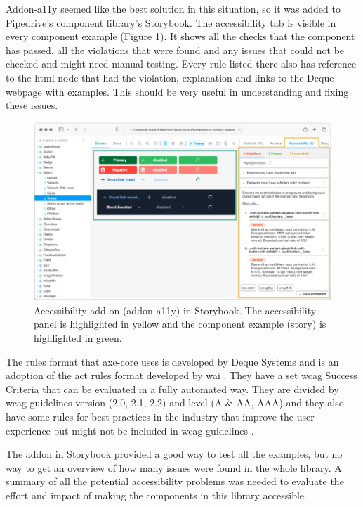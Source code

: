 \documentclass{master_thesis}
\begin{document}
Addon-a11y seemed like the best solution in this situation, so it was added to Pipedrive's component library’s Storybook. The accessibility tab is visible in every component example (Figure \ref{fig:addon-a11y}). It shows all the checks that the component has passed, all the violations that were found and any issues that could not be checked and might need manual testing. Every rule listed there also has reference to the \ac{html} node that had the violation, explanation and links to the Deque webpage with examples. This should be very useful in understanding and fixing these issues.

\begin{figure}[h]
	\includegraphics[width=\textwidth]{img/addon-a11y.png}
	\caption[Accessibility add-on (addon-a11y) in Storybook]{Accessibility add-on (addon-a11y) in Storybook. The accessibility panel is highlighted in yellow and the component example (story) is highlighted in green.}
	\label{fig:addon-a11y}
\end{figure}

The rules format that axe-core uses is developed by Deque Systems and is an adoption of the \ac{act} rules format developed by \ac{wai} \citep{Fiers2017}. They have a set \ac{wcag} Success Criteria that can be evaluated in a fully automated way. They are divided by \ac{wcag} guidelines version (2.0, 2.1, 2.2) and level (A \& AA, AAA) and they also have some rules for best practices in the industry that improve the user experience but might not be included in \ac{wcag} guidelines \citep{Fiers2023}.

The addon in Storybook provided a good way to test all the examples, but no way to get an overview of how many issues were found in the whole library. A summary of all the potential accessibility problems was needed to evaluate the effort and impact of making the components in this library accessible.
\end{document}
